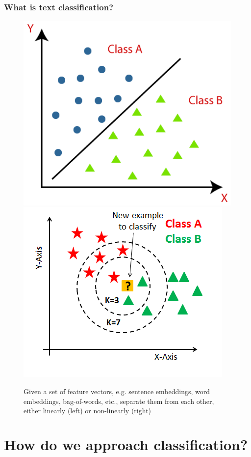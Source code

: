 \documentclass{beamer}
\begin{document}
\begin{frame}
    \frametitle{What is text classification?}
    \begin{figure}
        \includegraphics[scale=0.23]{classification}
        \includegraphics[scale=0.25]{knn_classification}
        \caption{Given a set of feature vectors, e.g. sentence embeddings, word embeddings, bag-of-words, etc., separate them from each other, either linearly (left) or non-linearly (right)}
    \end{figure}
\end{frame}

\section{How do we approach classification?}
\end{document}

